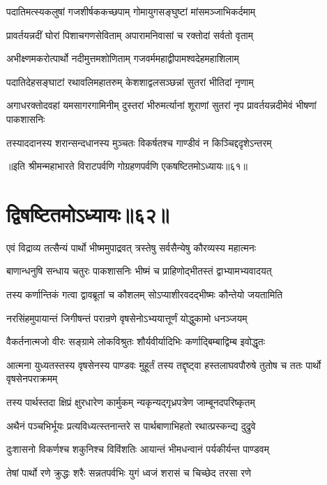 \twolineshloka
{पदातिमत्स्यकलुषां गजशीर्षककच्छपाम्}
{गोमायुगसङ्घुष्टां मांसमञ्जाभिकर्दमाम्}


\twolineshloka
{प्रावर्तयन्नदीं घोरां पिशाचगणसेविताम्}
{अपारामनिवासां च रक्तोदां सर्वतो वृताम्}


\twolineshloka
{अभीक्ष्णमकरोत्पार्थो नदीमुत्तमशोणिताम्}
{गजवर्ममहाद्वीपामश्वदेहमहाशिलाम्}


\twolineshloka
{पदातिदेहसङ्घाटां रथावलिमहातरुम्}
{केशशाद्वलसञ्छन्नां सुतरां भीतिदां नृणाम्}


\threelineshloka
{अगाधरक्तोदवहां यमसागरगामिनीम्}
{दुस्तरां भीरुमर्त्यानां शूराणां सुतरां नृप}
{प्रावर्तयन्नदीमेवं भीषणां पाकशासनिः}


\twolineshloka
{तस्याददानस्य शरान्सन्दधानस्य मुञ्चतः}
{विकर्षतश्च गाण्डीवं न किञ्चिद्ददृशेऽन्तरम्}

॥इति श्रीमन्महाभारते विराटपर्वणि गोग्रहणपर्वणि एकषष्टितमोऽध्यायः॥६१॥

\chapter{द्विषष्टितमोऽध्यायः॥६२॥}

\twolineshloka
{एवं विद्राव्य तत्सैन्यं पार्थो भीष्ममुपाद्रवत्}
{त्रस्तेषु सर्वसैन्येषु कौरव्यस्य महात्मनः}


\twolineshloka
{बाणान्धनुषि सन्धाय चतुरः पाकशासनिः}
{भीष्मं च प्राहिणोद्भीतस्तं द्वाभ्यामभ्यवादयत्}


\twolineshloka
{तस्य कर्णान्तिकं गत्वा द्वावब्रूतां च कौशलम्}
{सोऽप्याशीरवदद्भीष्मः कौन्तेयो जयतामिति}


\twolineshloka
{नरसिंहमुपायान्तं जिगीषन्तं परान्रणे}
{वृषसेनोऽभ्ययात्तूर्णं योद्धुकामो धनञ्जयम्}


\twolineshloka
{वैकर्तनात्मजो वीरः सङ्ग्रामे लोकविश्रुतः}
{शौर्यवीर्यादिभिः कर्णाद्बिम्बाद्विम्ब इवोद्धृतः}


\threelineshloka
{आत्मना युध्यतस्तस्य वृषसेनस्य पाण्डवः}
{मुहूर्तं तस्य तद्दृष्ट्वा हस्तलाघवपौरुषे}
{तुतोष च ततः पार्थो वृषसेनपराक्रमम्}


\twolineshloka
{तस्य पार्थस्तदा क्षिप्रं क्षुरधारेण कार्मुकम्}
{न्यकृन्यद्गृध्रपत्रेण जाम्बूनदपरिष्कृतम्}


\twolineshloka
{अथैनं पञ्चभिर्भूयः प्रत्यविध्यत्स्तनान्तरे}
{स पार्थबाणाभिहतो रथात्प्रस्कन्द्य दुद्रुवे}


\twolineshloka
{दुःशासनो विकर्णश्च शकुनिश्च विविंशतिः}
{आयान्तं भीमधन्वानं पर्यकीर्यन्त पाण्डवम्}


\twolineshloka
{तेषां पार्थो रणे क्रुद्धः शरैः सन्नतपर्वभिः}
{युगं ध्वजं शरासं च चिच्छेद तरसा रणे}


